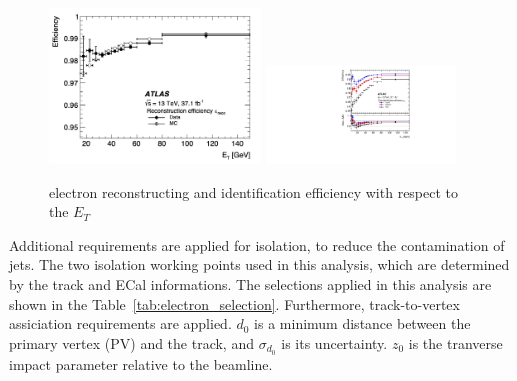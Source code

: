 \begin{figure}[tbp]
\begin{center}
 \includegraphics[width=0.50\textwidth,keepaspectratio]{figures/Reconstruction/recoElectron}
 \includegraphics[width=0.45\textwidth,keepaspectratio]{figures/Reconstruction/idElectron}
\caption{
electron reconstructing and identification efficiency with respect to the $E_T$
}
\label{fig:recoElectron}
\end{center}
\end{figure}
Additional requirements are applied for isolation, to reduce the contamination of jets. The two isolation working points used in this analysis, which are determined by the track and ECal informations. The selections applied in this analysis are shown in the Table~\ref{tab:electron_selection}.
Furthermore, track-to-vertex assiciation requirements are applied. 
$d_0$ is a minimum distance between the primary vertex (PV) and the track, and $\sigma_{d_0}$ is its uncertainty. $z_0$ is the tranverse impact parameter relative to the beamline.
\begin{table}[ht]
 \caption{Summary of electron selection used in this analysis}
 \label{tab:electron_selection}
\end{table}
